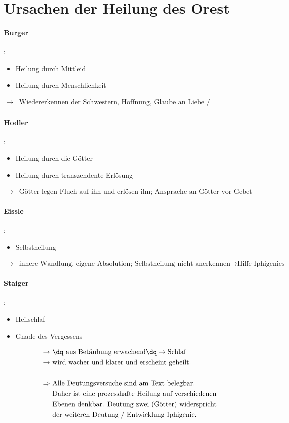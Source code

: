 \documentclass[12pt,a4paper]{report}
\begin{document}
	\section{Ursachen der Heilung des Orest}
	\paragraph{Burger}:
	\begin{itemize}
		\item Heilung durch Mittleid
		\item Heilung durch Menschlichkeit
	\end{itemize}
	\begin{align*}
		\to& \text{Wiedererkennen der Schwestern, Hoffnung, Glaube an Liebe / Menschlichkeit, Versöhnung}
	\end{align*}
	\paragraph{Hodler}:
	\begin{itemize}
		\item Heilung durch die Götter
		\item Heilung durch transzendente Erlösung
	\end{itemize}
	\begin{align*}
		\to& \text{Götter legen Fluch auf ihn und erlösen ihn; Ansprache an Götter vor  Gebet Iphigenies}
	\end{align*}
	\paragraph{Eissle}:
	\begin{itemize}
		\item Selbstheilung
	\end{itemize}
	\begin{align*}
		\to& \text{innere Wandlung, eigene Absolution; Selbstheilung nicht anerkennen} \to \text{Hilfe Iphigenies}
	\end{align*}
	\paragraph{Staiger}:
	\begin{itemize}
		\item Heilschlaf
		\item \dq Gnade des Vergessens\dq
	\end{itemize}
	\begin{align*}
		\to& \text{\ \dq aus Betäubung erwachend\dq}\to \text{Schlaf} \\
		\to&\  \text{wird wacher und klarer und erscheint geheilt.} \\
		\\
		\Rightarrow&\ \text{Alle Deutungsversuche sind am Text belegbar.} \\
		&\ \text{Daher ist eine prozesshafte Heilung auf verschiedenen} \\
		&\ \text{Ebenen denkbar. Deutung zwei (Götter) widerspricht} \\
		&\ \text{der weiteren Deutung / Entwicklung Iphigenie.}
	\end{align*}
\end{document}

